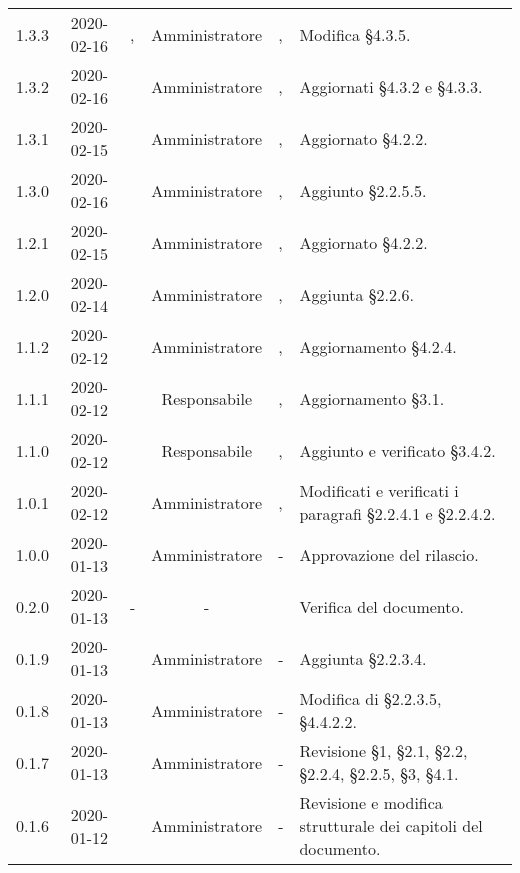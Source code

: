 {\begin{longtable}{ c c  C{2.3cm} c C{3cm} C{3.2cm}}
1.3.3 & 2020-02-16 & \DF{}, \PF{} & Amministratore & \CE{}, \MC{} & Modifica §4.3.5. \\

1.3.2 & 2020-02-16 & \SE{} & Amministratore & \CE{}, \MC{} & Aggiornati §4.3.2 e §4.3.3. \\

1.3.1 & 2020-02-15 & \SE{} & Amministratore & \CE{}, \MC{} & Aggiornato §4.2.2. \\

1.3.0 & 2020-02-16 & \SE{} & Amministratore & \CE{}, \MC{} & Aggiunto §2.2.5.5. \\

1.2.1 & 2020-02-15 & \SE{} & Amministratore & \CE{}, \MC{} & Aggiornato §4.2.2. \\

1.2.0 & 2020-02-14 & \SE{} & Amministratore & \CE{}, \MC{} & Aggiunta §2.2.6. \\

1.1.2 & 2020-02-12 & \SE{} & Amministratore & \CE{}, \MC{} & Aggiornamento §4.2.4. \\ 

1.1.1 & 2020-02-12 & \BR{} & Responsabile & \CE{}, \MC{} & Aggiornamento §3.1. \\ 

1.1.0 & 2020-02-12 & \BR{} & Responsabile & \CE{}, \MC{} & Aggiunto e verificato §3.4.2. \\

1.0.1 & 2020-02-12 & \SE{} & Amministratore & \CE{}, \MC{} & Modificati e verificati i paragrafi §2.2.4.1 e §2.2.4.2. \\ 

1.0.0 & 2020-01-13 & \AT{} & Amministratore & - & Approvazione del  rilascio.  \\

0.2.0 & 2020-01-13 & - & - & \PF{} & Verifica del documento.  \\ 

0.1.9 & 2020-01-13 & \CE{} & Amministratore & - & Aggiunta §2.2.3.4. \\

0.1.8 & 2020-01-13 & \BR{} & Amministratore & - & Modifica di §2.2.3.5, §4.4.2.2. \\

0.1.7 & 2020-01-13 & \AT{} & Amministratore & - & Revisione §1, §2.1, §2.2, §2.2.4, §2.2.5, §3, §4.1. \\

0.1.6 & 2020-01-12 & \MC{} & Amministratore & - & Revisione e modifica strutturale dei capitoli del documento. \\


\end{longtable}}
